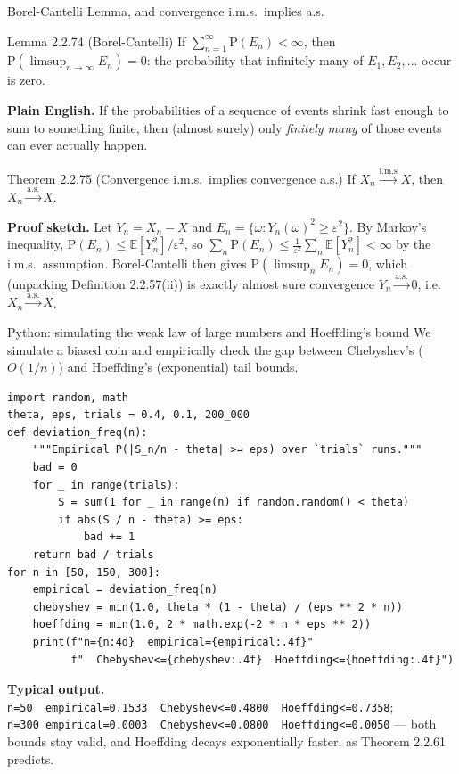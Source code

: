 \documentclass[aspectratio=169,10pt]{beamer}
\begin{document}
\begin{frame}{Borel-Cantelli Lemma, and convergence i.m.s.\ implies a.s.}
\begin{block}{Lemma 2.2.74 (Borel-Cantelli)}
If $\sum_{n=1}^{\infty}\mathrm{P}(E_n) < \infty$, then
$\mathrm{P}(\limsup_{n\to\infty}E_n)=0$: the probability that infinitely many
of $E_1,E_2,\ldots$ occur is zero.
\end{block}
\textbf{Plain English.} If the probabilities of a sequence of events shrink
fast enough to sum to something finite, then (almost surely) only
\emph{finitely many} of those events can ever actually happen.

\begin{block}{Theorem 2.2.75 (Convergence i.m.s.\ implies convergence a.s.)}
If $X_n\xrightarrow{\text{i.m.s}}X$, then $X_n\xrightarrow{\text{a.s.}}X$.
\end{block}
\textbf{Proof sketch.} Let $Y_n=X_n-X$ and $E_n=\{\omega : Y_n(\omega)^2\geq\varepsilon^2\}$.
By Markov's inequality, $\mathrm{P}(E_n)\leq\mathbb{E}[Y_n^2]/\varepsilon^2$, so
$\sum_n \mathrm{P}(E_n)\leq\tfrac{1}{\varepsilon^2}\sum_n\mathbb{E}[Y_n^2]<\infty$
by the i.m.s.\ assumption. Borel-Cantelli then gives
$\mathrm{P}(\limsup_n E_n)=0$, which (unpacking Definition 2.2.57(ii)) is
exactly almost sure convergence $Y_n\xrightarrow{\text{a.s.}}0$, i.e.\
$X_n\xrightarrow{\text{a.s.}}X$.
\end{frame}

\begin{frame}[fragile]{Python: simulating the weak law of large numbers and Hoeffding's bound}
We simulate a biased coin and empirically check the gap between Chebyshev's
($O(1/n)$) and Hoeffding's (exponential) tail bounds.
\begin{lstlisting}
import random, math
theta, eps, trials = 0.4, 0.1, 200_000
def deviation_freq(n):
    """Empirical P(|S_n/n - theta| >= eps) over `trials` runs."""
    bad = 0
    for _ in range(trials):
        S = sum(1 for _ in range(n) if random.random() < theta)
        if abs(S / n - theta) >= eps:
            bad += 1
    return bad / trials
for n in [50, 150, 300]:
    empirical = deviation_freq(n)
    chebyshev = min(1.0, theta * (1 - theta) / (eps ** 2 * n))
    hoeffding = min(1.0, 2 * math.exp(-2 * n * eps ** 2))
    print(f"n={n:4d}  empirical={empirical:.4f}"
          f"  Chebyshev<={chebyshev:.4f}  Hoeffding<={hoeffding:.4f}")
\end{lstlisting}
\textbf{Typical output.} \texttt{n=50\ \ empirical=0.1533\ \ Chebyshev<=0.4800\ \ Hoeffding<=0.7358};
\texttt{n=300\ empirical=0.0003\ \ Chebyshev<=0.0800\ \ Hoeffding<=0.0050}
--- both bounds stay valid, and Hoeffding decays exponentially faster, as
Theorem 2.2.61 predicts.
\end{frame}
\end{document}
